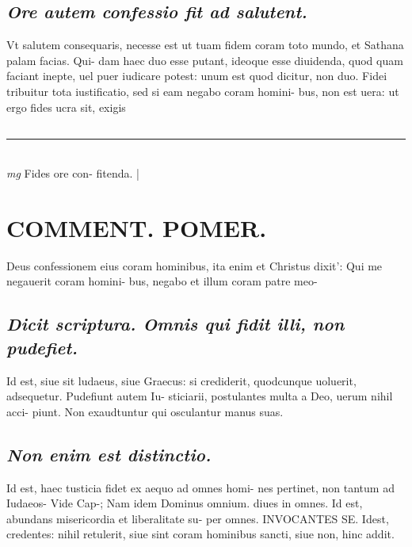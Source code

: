 \documentclass{article}
\begin{document}
\begin{pages}
\subsection*{\textit{Ore autem confessio fit ad salutent. }}\pstart Vt salutem consequaris, necesse est ut tuam fidem coram toto mundo, et Sathana palam facias. Qui- dam haec duo esse putant, ideoque esse diuidenda, quod quam faciant inepte, uel puer iudicare potest: unum est quod dicitur, non duo. Fidei tribuitur tota iustificatio, sed si eam negabo coram homini- bus, non est uera: ut ergo fides ucra sit, exigis  \pend
{}
{}
\subsection*{\textit{}}
\vspace{0.5cm}\noindent
\vspace{0.2cm}\rule{1cm}{0.2pt}\\ 
\hspace{0.2cm}\textit{mg}
\footnotesize Fides ore con- fitenda.  
\normalsize| 
\section*{COMMENT. POMER.  }\pstart Deus confessionem eius coram hominibus, ita enim et Christus dixit': Qui me negauerit coram homini- bus, negabo et illum coram patre meo-  \pend
{}
{}
\subsection*{\textit{Dicit scriptura. Omnis qui fidit illi, non pudefiet. }}\pstart Id est, siue sit ludaeus, siue Graecus: si crediderit, quodcunque uoluerit, adsequetur. Pudefiunt autem Iu- sticiarii, postulantes multa a Deo, uerum nihil acci- piunt. Non exaudtuntur qui osculantur manus suas.  \pend
{}
{}
\subsection*{\textit{Non enim est distinctio. }}\pstart Id est, haec tusticia fidet ex aequo ad omnes homi- nes pertinet, non tantum ad Iudaeos- Vide Cap-;  \pend\pstart Nam idem Dominus omnium. diues in omnes.  \pend\pstart Id est, abundans misericordia et liberalitate su- per omnes. INVOCANTES SE. Idest, credentes: nihil retulerit, siue sint coram hominibus sancti, siue non, hinc addit.   \pend
{}
{}

\end{pages}
\end{document}
